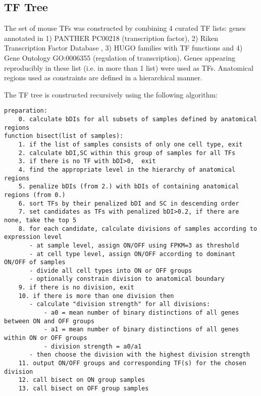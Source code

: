 \subsection{TF Tree}
The set of mouse TFs was constructed by combining 4 curated TF lists: genes annotated in 1) PANTHER \citep{Thomas_2003} PC00218 (transcription factor), 2) Riken Transcription Factor Database \citep{Kanamori_2004}, 3) HUGO \citep{Gray_2014} families with TF functions and 4) Gene Ontology \citep{Ashburner_2000} GO:0006355 (regulation of transcription). Genes appearing reproducibly in these list (i.e. in more than 1 list) were used as TFs. Anatomical regions used as constraints are defined in a hierarchical manner. 

The TF tree is constructed recursively using the following algorithm:
\begin{verbatim}
preparation:
    0. calculate bDIs for all subsets of samples defined by anatomical regions
function bisect(list of samples):
    1. if the list of samples consists of only one cell type, exit
    2. calculate bDI,SC within this group of samples for all TFs
    3. if there is no TF with bDI>0,  exit
    4. find the appropriate level in the hierarchy of anatomical regions
    5. penalize bDIs (from 2.) with bDIs of containing anatomical regions (from 0.)
    6. sort TFs by their penalized bDI and SC in descending order
    7. set candidates as TFs with penalized bDI>0.2, if there are none, take the top 5
    8. for each candidate, calculate divisions of samples according to expression level
       - at sample level, assign ON/OFF using FPKM=3 as threshold
       - at cell type level, assign ON/OFF according to dominant ON/OFF of samples
       - divide all cell types into ON or OFF groups
       - optionally constrain division to anatomical boundary
    9. if there is no division, exit
    10. if there is more than one division then
       - calculate "division strength" for all divisions:
           - a0 = mean number of binary distinctions of all genes between ON and OFF groups
           - a1 = mean number of binary distinctions of all genes within ON or OFF groups
           - division strength = a0/a1
       - then choose the division with the highest division strength
    11. output ON/OFF groups and corresponding TF(s) for the chosen division
    12. call bisect on ON group samples
    13. call bisect on OFF group samples
\end{verbatim}

